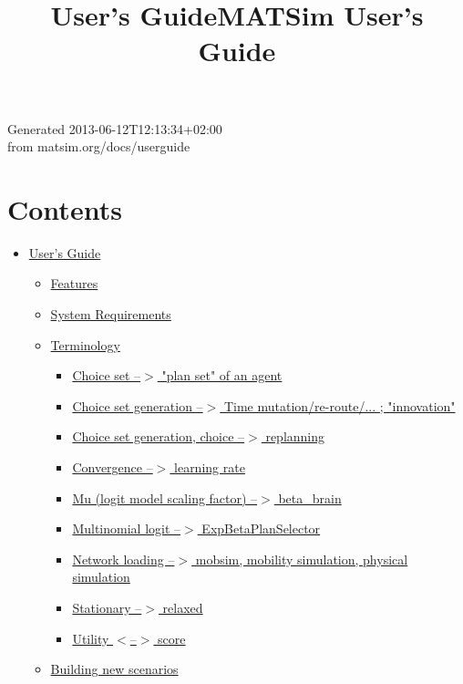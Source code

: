 \documentclass[a4paper,11pt]{report}
\title{User's Guide}
\begin{document}

\title{MATSim User's Guide}
\maketitle

Generated 2013-06-12T12:13:34+02:00
\\from matsim.org/docs/userguide

\chapter{Contents}
\begin{itemize}
	\item \href{http://www.matsim.org/docs/userguide}{User's Guide}
\begin{itemize}
	\item \href{http://www.matsim.org/features}{Features}
	\item \href{http://www.matsim.org/system-requirements}{System Requirements}
	\item \href{http://www.matsim.org/terminology}{Terminology}
\begin{itemize}
	\item \href{http://www.matsim.org/node/539}{Choice set --$>$ "plan set" of an agent}
	\item \href{http://www.matsim.org/node/540}{Choice set generation --$>$ Time mutation/re-route/... ; "innovation"}
	\item \href{http://www.matsim.org/node/546}{Choice set generation, choice --$>$ replanning}
	\item \href{http://www.matsim.org/node/547}{Convergence --$>$ learning rate}
	\item \href{http://www.matsim.org/node/545}{Mu (logit model scaling factor) --$>$ beta\_brain}
	\item \href{http://www.matsim.org/node/541}{Multinomial logit --$>$ ExpBetaPlanSelector}
	\item \href{http://www.matsim.org/node/543}{Network loading --$>$ mobsim, mobility simulation, physical simulation}
	\item \href{http://www.matsim.org/node/542}{Stationary --$>$ relaxed}
	\item \href{http://www.matsim.org/node/544}{Utility $<$--$>$ score}
\end{itemize}
	\item \href{http://www.matsim.org/docs/new-scenario}{Building new scenarios}
\begin{itemize}

\end{itemize}
\end{itemize}
\end{itemize}
\end{document}
